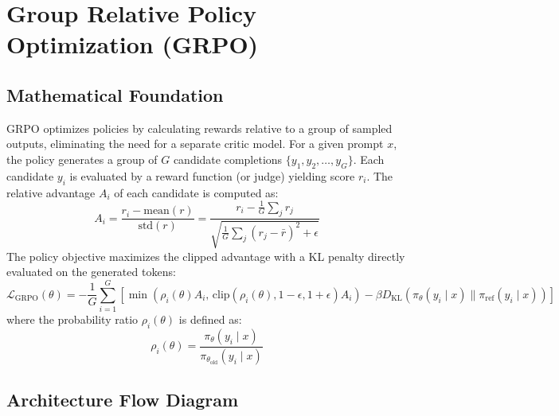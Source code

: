 \newpage
\section{Group Relative Policy Optimization (GRPO)}

\subsection{Mathematical Foundation}
GRPO optimizes policies by calculating rewards relative to a group of sampled outputs, eliminating the need for a separate critic model.
For a given prompt $x$, the policy generates a group of $G$ candidate completions $\{y_1, y_2, \dots, y_G\}$. Each candidate $y_i$ is evaluated by a reward function (or judge) yielding score $r_i$.
The relative advantage $A_i$ of each candidate is computed as:
\begin{equation}
  A_i = \frac{r_i - \text{mean}(r)}{\text{std}(r)} = \frac{r_i - \frac{1}{G}\sum_j r_j}{\sqrt{\frac{1}{G}\sum_j (r_j - \bar{r})^2 + \epsilon}}
\end{equation}
The policy objective maximizes the clipped advantage with a KL penalty directly evaluated on the generated tokens:
\begin{equation}
  \mathcal{L}_{\text{GRPO}}(\theta) = -\frac{1}{G} \sum_{i=1}^G \left[ \min\left( \rho_i(\theta) A_i, \, \text{clip}(\rho_i(\theta), 1-\epsilon, 1+\epsilon) A_i \right) - \beta D_{\text{KL}}\left( \pi_\theta(y_i \mid x) \parallel \pi_{\text{ref}}(y_i \mid x) \right) \right]
\end{equation}
where the probability ratio $\rho_i(\theta)$ is defined as:
\begin{equation}
  \rho_i(\theta) = \frac{\pi_\theta(y_i \mid x)}{\pi_{\theta_{\text{old}}}(y_i \mid x)}
\end{equation}

\subsection{Architecture Flow Diagram}

